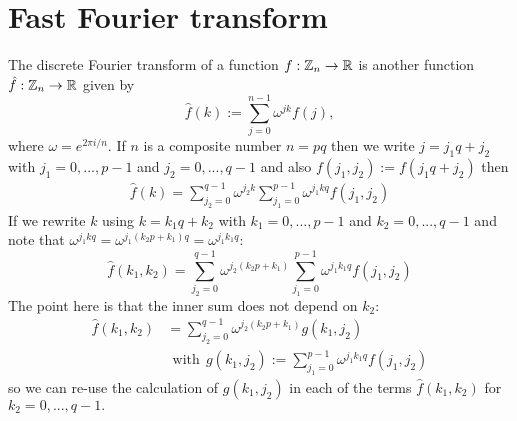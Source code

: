 \documentclass[11pt]{article}
\begin{document}
%
%

\section{Fast Fourier transform}



The discrete Fourier transform of a function $f:\mathbb Z_n\to \mathbb R$
is another function $\hat{f}:\mathbb Z_n\to \mathbb R$ given by
$$
    \hat{f}(k) := \sum_{j=0}^{n-1} \omega^{jk}f(j),%
$$
where $\omega=e^{2\pi i/n}.$
If $n$ is a composite number $n=pq$ then we
write $j=j_1 q + j_2$ with $j_1 = 0,...,p-1$ and $j_2 = 0,...,q-1$
and also $f(j_1, j_2):=f(j_1 q + j_2)$
then
\begin{align*}
        \hat{f}(k) = \sum_{j_2=0}^{q-1} \omega^{j_2k} \sum_{j_1=0}^{p-1} \omega^{j_1kq} f(j_1,j_2) 
\end{align*}
If we rewrite $k$ using
$k=k_1 q + k_2$ with $k_1 = 0,...,p-1$ and $k_2 = 0,...,q-1$
and note that 
$\omega^{j_1kq}=\omega^{j_1(k_2p+k_1)q}=\omega^{j_1k_1q}:$
$$
        \hat{f}(k_1, k_2) = \sum_{j_2=0}^{q-1} \omega^{j_2(k_2 p+k_1)} \sum_{j_1=0}^{p-1} \omega^{j_1k_1q} f(j_1,j_2)
$$
The point here is that the inner sum does not depend on $k_2:$
\begin{align*}
        \hat{f}(k_1, k_2) &= \sum_{j_2=0}^{q-1} \omega^{j_2(k_2 p+k_1)} g(k_1, j_2) \\
        &\ \ \mathrm{with} \ \ g(k_1,j_2) := \sum_{j_1=0}^{p-1} \omega^{j_1k_1q} f(j_1,j_2)
\end{align*}
so we can re-use the calculation of $g(k_1, j_2)$ 
in each of the terms $\hat{f}(k_1, k_2)$ for $k_2=0,...,q-1.$
\end{document}
